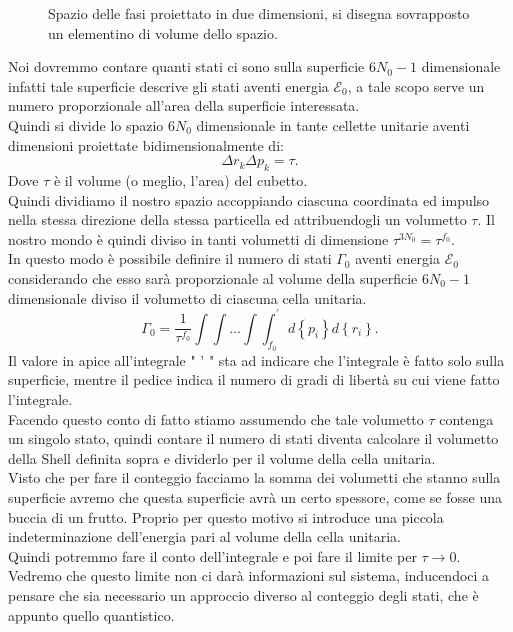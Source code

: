 \begin{figure}[H]
    \centering
    \caption{\scriptsize Spazio delle fasi proiettato in due dimensioni, si disegna sovrapposto un elementino di volume dello spazio.}
    \label{fig:spazio-delle-fasi-proiettato-in-due-dimensioni}
\end{figure}
\noindent
Noi dovremmo contare quanti stati ci sono sulla superficie $6N_0-1$ dimensionale infatti tale superficie descrive gli stati aventi energia $\mathcal{E}_0$, a tale scopo serve un numero proporzionale all'area della superficie interessata. \\
Quindi si divide lo spazio $6N_0$ dimensionale in tante cellette unitarie aventi dimensioni proiettate bidimensionalmente di: 
\[
\Delta r_{k} \Delta p_{k} = \tau
.\]
Dove $\tau$ è il volume (o meglio, l'area) del cubetto.\\
Quindi dividiamo il nostro spazio accoppiando ciascuna coordinata ed impulso nella stessa direzione della stessa particella ed attribuendogli un volumetto $\tau$. Il nostro mondo è quindi diviso in tanti volumetti di dimensione $\tau^{3N_0} = \tau^{f_0}$.\\
In questo modo è possibile definire il numero di stati $\Gamma_0$ aventi energia $\mathcal{E}_0$ considerando che esso sarà proporzionale al volume della superficie $6N_0-1$ dimensionale diviso il volumetto di ciascuna cella unitaria.
\[
	\Gamma_0 = \frac{1}{\tau^{f_0}} \int\int\ldots\int\int_{f_0}^{'}d\left\{ p_{i} \right\} d\left\{ r_{i} \right\} 
.\] 
Il valore in apice all'integrale " ' " sta ad indicare che l'integrale è fatto solo sulla superficie, mentre il pedice indica il numero di gradi di libertà su cui viene fatto l'integrale.\\
Facendo questo conto di fatto stiamo assumendo che tale volumetto $\tau$ contenga un singolo stato, quindi contare il numero di stati diventa calcolare il volumetto della Shell definita sopra e dividerlo per il volume della cella unitaria.\\
Visto che per fare il conteggio facciamo la somma dei volumetti che stanno sulla superficie avremo che questa superficie avrà un certo spessore, come se fosse una buccia di un frutto. Proprio per questo motivo si introduce una piccola indeterminazione dell'energia pari al volume della cella unitaria.\\
Quindi potremmo fare il conto dell'integrale e poi fare il limite per $\tau \rightarrow 0$. Vedremo che questo limite non ci darà informazioni sul sistema, inducendoci a pensare che sia necessario un approccio diverso al conteggio degli stati, che è appunto quello quantistico.\\
